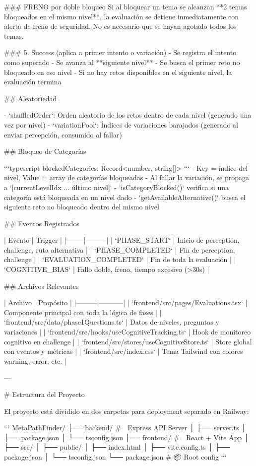 ### FRENO por doble bloqueo
Si al bloquear un tema se alcanzan **2 temas bloqueados en el mismo nivel**, la evaluación se detiene inmediatamente con alerta de freno de seguridad. No es necesario que se hayan agotado todos los temas.

### 5. Success (aplica a primer intento o variación)
- Se registra el intento como superado
- Se avanza al **siguiente nivel**
- Se busca el primer reto no bloqueado en ese nivel
- Si no hay retos disponibles en el siguiente nivel, la evaluación termina

## Aleatoriedad

- `shuffledOrder`: Orden aleatorio de los retos dentro de cada nivel (generado una vez por nivel)
- `variationPool`: Índices de variaciones barajados (generado al enviar percepción, consumido al fallar)

## Bloqueo de Categorías

```typescript
blockedCategories: Record<number, string[]>
```
- Key = índice del nivel, Value = array de categorías bloqueadas
- Al fallar la variación, se propaga a `[currentLevelIdx ... último nivel]`
- `isCategoryBlocked()` verifica si una categoría está bloqueada en un nivel dado
- `getAvailableAlternative()` busca el siguiente reto no bloqueado dentro del mismo nivel

## Eventos Registrados

| Evento | Trigger |
|--------|---------|
| `PHASE_START` | Inicio de perception, challenge, ruta alternativa |
| `PHASE_COMPLETED` | Fin de perception, challenge |
| `EVALUATION_COMPLETED` | Fin de toda la evaluación |
| `COGNITIVE_BIAS` | Fallo doble, freno, tiempo excesivo (>30s) |

## Archivos Relevantes

| Archivo | Propósito |
|---------|-----------|
| `frontend/src/pages/Evaluations.tsx` | Componente principal con toda la lógica de fases |
| `frontend/src/data/phase1Questions.ts` | Datos de niveles, preguntas y variaciones |
| `frontend/src/hooks/useCognitiveTracking.ts` | Hook de monitoreo cognitivo en challenge |
| `frontend/src/stores/useCognitiveStore.ts` | Store global con eventos y métricas |
| `frontend/src/index.css` | Tema Tailwind con colores warning, error, etc. |

---

# Estructura del Proyecto

El proyecto está dividido en dos carpetas para deployment separado en Railway:

```
MetaPathFinder/
├── backend/          # 🔷 Express API Server
│   ├── server.ts
│   ├── package.json
│   └── tsconfig.json
├── frontend/         # 🔶 React + Vite App
│   ├── src/
│   ├── public/
│   ├── index.html
│   ├── vite.config.ts
│   ├── package.json
│   └── tsconfig.json
└── package.json      # 📦 Root config
```

